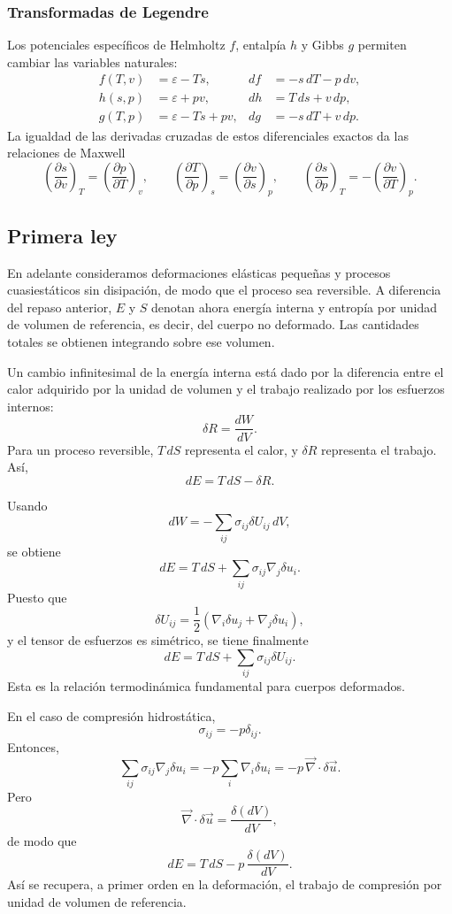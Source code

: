 \subsubsection{Transformadas de Legendre}

Los potenciales específicos de Helmholtz $f$, entalpía $h$ y Gibbs $g$ permiten cambiar las variables naturales:
\[
\begin{aligned}
f(T,v)&=\varepsilon-Ts, & df&=-s\,dT-p\,dv,\\
h(s,p)&=\varepsilon+pv, & dh&=T\,ds+v\,dp,\\
g(T,p)&=\varepsilon-Ts+pv, & dg&=-s\,dT+v\,dp.
\end{aligned}
\]
La igualdad de las derivadas cruzadas de estos diferenciales exactos da las relaciones de Maxwell
\[
\left(\frac{\partial s}{\partial v}\right)_T
=\left(\frac{\partial p}{\partial T}\right)_v,
\qquad
\left(\frac{\partial T}{\partial p}\right)_s
=\left(\frac{\partial v}{\partial s}\right)_p,
\qquad
\left(\frac{\partial s}{\partial p}\right)_T
=-\left(\frac{\partial v}{\partial T}\right)_p.
\]

\subsection{Primera ley}

En adelante consideramos deformaciones elásticas pequeñas y procesos cuasiestáticos sin disipación, de modo que el proceso sea reversible. A diferencia del repaso anterior, $E$ y $S$ denotan ahora energía interna y entropía por unidad de volumen de referencia, es decir, del cuerpo no deformado. Las cantidades totales se obtienen integrando sobre ese volumen.

Un cambio infinitesimal de la energía interna está dado por la diferencia entre el calor adquirido por la unidad de volumen y el trabajo realizado por los esfuerzos internos:
$$ \delta R = \frac{dW}{dV}. $$
Para un proceso reversible, $T\,dS$ representa el calor, y $\delta R$ representa el trabajo. Así,
$$ dE = T\,dS - \delta R. $$

Usando
$$ dW = -\sum_{ij}\sigma_{ij}\delta U_{ij}\,dV, $$
se obtiene
$$ dE = T\,dS + \sum_{ij}\sigma_{ij}\nabla_j\delta u_i. $$
Puesto que
$$ \delta U_{ij} = \frac{1}{2}(\nabla_i\delta u_j + \nabla_j\delta u_i), $$
y el tensor de esfuerzos es simétrico, se tiene finalmente
$$ dE = T\,dS + \sum_{ij}\sigma_{ij}\delta U_{ij}. $$
Esta es la relación termodinámica fundamental para cuerpos deformados.

En el caso de compresión hidrostática,
$$ \sigma_{ij} = -p\delta_{ij}. $$
Entonces,
$$ \sum_{ij}\sigma_{ij}\nabla_j\delta u_i = -p\sum_i\nabla_i\delta u_i = -p\,\vec{\nabla}\cdot\delta\vec{u}. $$
Pero
$$ \vec{\nabla}\cdot\delta\vec{u} = \frac{\delta(dV)}{dV}, $$
de modo que
$$ dE = T\,dS - p\,\frac{\delta(dV)}{dV}. $$
Así se recupera, a primer orden en la deformación, el trabajo de compresión por unidad de volumen de referencia.